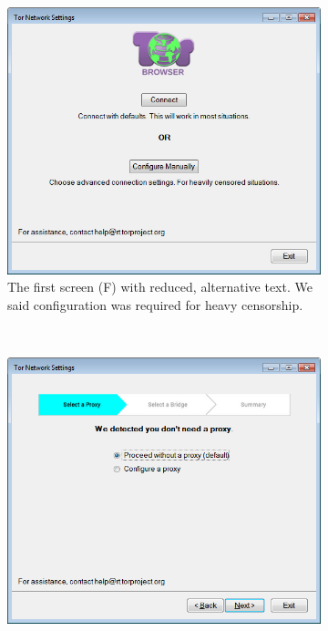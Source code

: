 \documentclass[USenglish,oneside,twocolumn]{article}
\begin{document}
\begin{figure}
\centering
\begin{subfigure}[b]{0.30\textwidth}
	\includegraphics[width=\textwidth]{screenshots/NEW-first.png}
	\centering\captionsetup{width=1.5\linewidth}%
	\caption{The first screen (F) with reduced, alternative text. We said configuration was required for heavy censorship.}
	\label{fig:new-first}
\end{subfigure}
~~~~~~~~~~~~~~~~~~~~~~~~~
\begin{subfigure}[b]{0.30\textwidth}
	\includegraphics[width=\textwidth]{screenshots/NEW-proxyYES.png}

\end{subfigure}
\end{figure}
\end{document}
